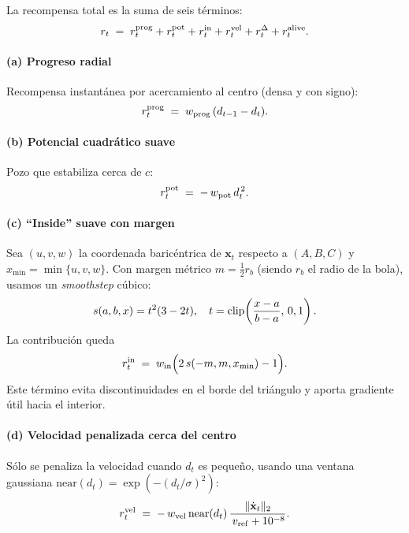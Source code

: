 \documentclass[conference]{IEEEtran}
\begin{document}
La recompensa total es la suma de seis términos:
\begin{equation}
\small
r_t \;=\; r_t^{\mathrm{prog}} + r_t^{\mathrm{pot}} + r_t^{\mathrm{in}} + r_t^{\mathrm{vel}} + r_t^{\Delta} + r_t^{\mathrm{alive}}.
\label{eq:r_total}
\end{equation}

\paragraph{(a) Progreso radial}
Recompensa instantánea por acercamiento al centro (densa y con signo):
\begin{equation}
\small
r_t^{\mathrm{prog}} \;=\; w_{\mathrm{prog}}\,(d_{t-1} - d_t).
\end{equation}

\paragraph{(b) Potencial cuadrático suave}
Pozo que estabiliza cerca de $c$:
\begin{equation}
\small
r_t^{\mathrm{pot}} \;=\; -\,w_{\mathrm{pot}}\, d_t^{\,2}.
\end{equation}

\paragraph{(c) ``Inside'' suave con margen}
Sea $(u,v,w)$ la coordenada baricéntrica de $\mathbf{x}_t$ respecto a $(A,B,C)$ y $x_{\min}=\min\{u,v,w\}$. Con margen métrico $m=\tfrac{1}{2}r_b$ (siendo $r_b$ el radio de la bola), usamos un \textit{smoothstep} cúbico:
\[
\small
s(a,b,x)=t^2(3-2t), \quad 
t=\mathrm{clip}\!\left(\frac{x-a}{b-a},\,0,1\right).
\]
La contribución queda
\begin{equation}
\small
r_t^{\mathrm{in}} \;=\; w_{\mathrm{in}}\Big(2\,s(-m,m,x_{\min})-1\Big).
\end{equation}
Este término evita discontinuidades en el borde del triángulo y aporta gradiente útil hacia el interior.

\paragraph{(d) Velocidad penalizada cerca del centro}
Sólo se penaliza la velocidad cuando $d_t$ es pequeño, usando una ventana gaussiana $\mathrm{near}(d_t)=\exp(- (d_t/\sigma)^2)$:
\begin{equation}
\small
r_t^{\mathrm{vel}}
\;=\;
-\,w_{\mathrm{vel}}\,\mathrm{near}(d_t)\,
\frac{\lVert \dot{\mathbf{x}}_t\rVert_2}{\,v_{\mathrm{ref}}+10^{-8}} .
\label{eq:rvel}
\end{equation}
\end{document}
